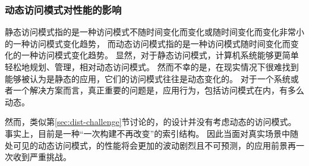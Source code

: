 
\subsubsection{动态访问模式对{\li}性能的影响}

静态访问模式指的是一种访问模式不随时间变化而变化或随时间变化而变化非常小的一种访问模式变化趋势，
而动态访问模式指的是一种访问模式随时间变化而变化的一种访问模式变化趋势。
显然，对于静态访问模式，计算机系统能够更简单轻松地规划、管理，相对动态访问模式。
然而不幸的是，在现实情况下很难找到能够被认为是静态的应用，它们的访问模式往往是动态变化的。
对于一个系统或者一个解决方案而言，真正重要的问题是，应用行为，包括访问模式在内，有多么动态。


然而，类似第\ref{sec:dist-challenge}节讨论的，{\li}的设计并没有考虑动态的访问模式。
事实上，{\li}目前是一种“一次构建不再改变”的索引结构。
因此当面对真实场景中随处可见的动态访问模式，{\li}的性能将会更加的波动剧烈且不可预测，{\li}的应用前景再一次收到严重挑战。

